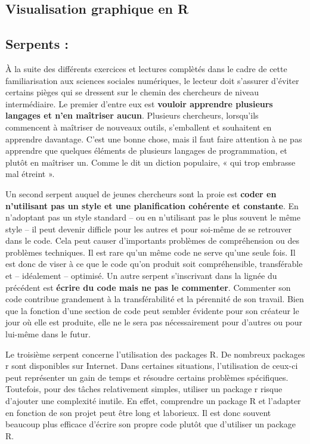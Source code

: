 \documentclass[
  letterpaper,
]{scrbook}
\begin{document}
\hypertarget{visualisation-graphique-en-r}{%
\subsection{Visualisation graphique en
R}\label{visualisation-graphique-en-r}}

\hypertarget{serpents-1}{%
\subsection{Serpents :}\label{serpents-1}}

À la suite des différents exercices et lectures complètés dans le cadre
de cette familiarisation aux sciences sociales numériques, le lecteur
doit s'assurer d'éviter certains pièges qui se dressent sur le chemin
des chercheurs de niveau intermédiaire. Le premier d'entre eux est
\textbf{vouloir apprendre plusieurs langages et n'en maîtriser aucun}.
Plusieurs chercheurs, lorsqu'ils commencent à maîtriser de nouveaux
outils, s'emballent et souhaitent en apprendre davantage. C'est une
bonne chose, mais il faut faire attention à ne pas apprendre que
quelques éléments de plusieurs langages de programmation, et plutôt en
maîtriser un. Comme le dit un diction populaire, « qui trop embrasse mal
étreint ».

Un second serpent auquel de jeunes chercheurs sont la proie est
\textbf{coder en n'utilisant pas un style et une planification cohérente
et constante}. En n'adoptant pas un style standard -- ou en n'utilisant
pas le plus souvent le même style -- il peut devenir difficle pour les
autres et pour soi-même de se retrouver dans le code. Cela peut causer
d'importants problèmes de compréhension ou des problèmes techniques. Il
est rare qu'un même code ne serve qu'une seule fois. Il est donc de
viser à ce que le code qu'on produit soit compréhensible, transférable
et -- idéalement -- optimisé. Un autre serpent s'inscrivant dans la
lignée du précédent est \textbf{écrire du code mais ne pas le
commenter}. Commenter son code contribue grandement à la transférabilité
et la pérennité de son travail. Bien que la fonction d'une section de
code peut sembler évidente pour son créateur le jour où elle est
produite, elle ne le sera pas nécessairement pour d'autres ou pour
lui-même dans le futur.

Le troisième serpent concerne l'utilisation des packages R. De nombreux
packages r sont disponibles sur Internet. Dans certaines situations,
l'utilisation de ceux-ci peut représenter un gain de temps et résoudre
certains problèmes spécifiques. Toutefois, pour des tâches relativement
simples, utiliser un package r risque d'ajouter une complexité inutile.
En effet, comprendre un package R et l'adapter en fonction de son projet
peut être long et laborieux. Il est donc souvent beaucoup plus efficace
d'écrire son propre code plutôt que d'utiliser un package R.
\end{document}
